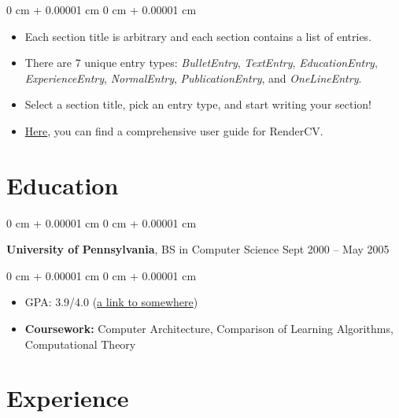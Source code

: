 \documentclass[10pt, letterpaper]{article}
\newenvironment{highlights}{
    \begin{itemize}[
        topsep=0.10 cm,
        parsep=0.10 cm,
        partopsep=0pt,
        itemsep=0pt,
        leftmargin=0 cm + 10pt
    ]
}{
    \end{itemize}
} %
\newenvironment{highlightsforbulletentries}{
    \begin{itemize}[
        topsep=0.10 cm,
        parsep=0.10 cm,
        partopsep=0pt,
        itemsep=0pt,
        leftmargin=10pt
    ]
}{
    \end{itemize}
} %
\newenvironment{onecolentry}{
    \begin{adjustwidth}{
        0 cm + 0.00001 cm
    }{
        0 cm + 0.00001 cm
    }
}{
    \end{adjustwidth}
} %
\newenvironment{twocolentry}[2][]{
    \onecolentry
    \def\secondColumn{#2}
    \setcolumnwidth{\fill, 4.5 cm}
    \begin{paracol}{2}
}{
    \switchcolumn \raggedleft \secondColumn
    \end{paracol}
    \endonecolentry
} %
\begin{document}
\begin{onecolentry}
	\begin{highlightsforbulletentries}
		
		
		\item Each section title is arbitrary and each section contains a list of entries.
		
		\item There are 7 unique entry types: \textit{BulletEntry}, \textit{TextEntry}, \textit{EducationEntry}, \textit{ExperienceEntry}, \textit{NormalEntry}, \textit{PublicationEntry}, and \textit{OneLineEntry}.
		
		\item Select a section title, pick an entry type, and start writing your section!
		
		\item \href{https://docs.rendercv.com/user_guide/}{Here}, you can find a comprehensive user guide for RenderCV.
		
		
	\end{highlightsforbulletentries}
\end{onecolentry}

\section{Education}



        
\begin{twocolentry}{
		Sept 2000 – May 2005
	}
	\textbf{University of Pennsylvania}, BS in Computer Science\end{twocolentry}
	
	\vspace{0.10 cm}
	\begin{onecolentry}
		\begin{highlights}
			\item GPA: 3.9/4.0 (\href{https://example.com}{a link to somewhere})
			\item \textbf{Coursework:} Computer Architecture, Comparison of Learning Algorithms, Computational Theory
		\end{highlights}
	\end{onecolentry}
	
	
	
	    
	\section{Experience}
	
	
	
\end{document}
